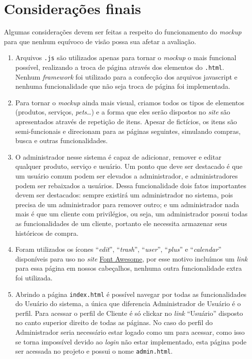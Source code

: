 \chapter{Considerações finais}
Algumas considerações devem ser feitas a respeito do funcionamento do \emph{mockup} para que nenhum equívoco de visão possa sua afetar a avaliação.
\begin{enumerate}
	\item Arquivos \texttt{.js} são utilizados apenas para tornar o \emph{mockup} o mais funcional possível, realizando a troca de página através dos elementos do \texttt{.html}. Nenhum \emph{framework} foi utilizado para a confecção dos arquivos javascript e nenhuma funcionalidade que não seja troca de página foi implementada.

	\item Para tornar o \emph{mockup} ainda mais visual, criamos todos os tipos de elementos (produtos, serviços, \emph{pets}\ldots) e a forma que eles serão dispostos no \emph{site} são apresentados através de repetição de itens. Apesar de fictícios, os itens são semi-funcionais e direcionam para as páginas seguintes, simulando compras, busca e outras funcionalidades.

	\item O administrador nesse sistema é capaz de adicionar, remover e editar qualquer produto, serviço e usuário. Um ponto que deve ser destacado é que um usuário comum podem ser elevados a administrador, e administradores podem ser rebaixados a usuários. Dessa funcionalidade dois fatos importantes devem ser destacados: sempre existirá um administrador no sistema, pois precisa de um administrador para remover outro; e um administrador nada mais é que um cliente com privilégios, ou seja, um administrador possui todas as funcionalidades de um cliente, portanto ele necessita armazenar seus históricos de compra.

	\item Foram utilizados os ícones “\emph{edit}”, “\emph{trash}”, “\emph{user}”, “\emph{plus}” e “\emph{calendar}” disponíveis para uso no \emph{site} \href{https://fontawesome.com/}{Font Awesome}, por esse motivo incluímos um \emph{link} para essa página em nossos cabeçalhos, nenhuma outra funcionalidade extra foi utilizada.

	\item Abrindo a página \texttt{index.html} é possível navegar por todas as funcionalidades do Usuário do sistema, a única que diferencia Administrador de Usuário é o perfil. Para acessar o perfil de Cliente é só clickar no \emph{link} “Usuário” disposto no canto superior direito de todas as páginas. No caso do perfil do Administrador seria necessário estar logado como um para acessar, como isso se torna impossível devido ao \emph{login} não estar implementado, esta página pode ser acessada no projeto e possui o nome \texttt{admin.html}.


\end{enumerate}

